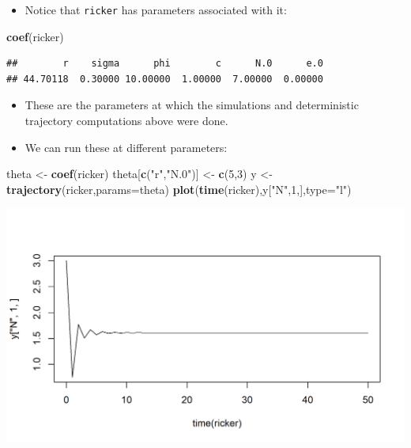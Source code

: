 \documentclass[]{article}
\newenvironment{Shaded}{\begin{snugshade}}{\end{snugshade}}
\newcommand{\KeywordTok}[1]{\textcolor[rgb]{0.13,0.29,0.53}{\textbf{#1}}}
\newcommand{\DataTypeTok}[1]{\textcolor[rgb]{0.13,0.29,0.53}{#1}}
\newcommand{\DecValTok}[1]{\textcolor[rgb]{0.00,0.00,0.81}{#1}}
\newcommand{\StringTok}[1]{\textcolor[rgb]{0.31,0.60,0.02}{#1}}
\newcommand{\NormalTok}[1]{#1}
\providecommand{\tightlist}{%
  \setlength{\itemsep}{0pt}\setlength{\parskip}{0pt}}
\begin{document}
\begin{itemize}
\tightlist
\item
  Notice that \texttt{ricker} has parameters associated with it:
\end{itemize}

\begin{Shaded}
\begin{Highlighting}[]
\KeywordTok{coef}\NormalTok{(ricker)}
\end{Highlighting}
\end{Shaded}

\begin{verbatim}
##        r    sigma      phi        c      N.0      e.0 
## 44.70118  0.30000 10.00000  1.00000  7.00000  0.00000
\end{verbatim}


\begin{itemize}
\item
  These are the parameters at which the simulations and deterministic
  trajectory computations above were done.
\item
  We can run these at different parameters:
\end{itemize}

\begin{Shaded}
\begin{Highlighting}[]
\NormalTok{theta <-}\StringTok{ }\KeywordTok{coef}\NormalTok{(ricker)}
\NormalTok{theta[}\KeywordTok{c}\NormalTok{(}\StringTok{"r"}\NormalTok{,}\StringTok{"N.0"}\NormalTok{)] <-}\StringTok{ }\KeywordTok{c}\NormalTok{(}\DecValTok{5}\NormalTok{,}\DecValTok{3}\NormalTok{)}
\NormalTok{y <-}\StringTok{ }\KeywordTok{trajectory}\NormalTok{(ricker,}\DataTypeTok{params=}\NormalTok{theta)}
\KeywordTok{plot}\NormalTok{(}\KeywordTok{time}\NormalTok{(ricker),y[}\StringTok{"N"}\NormalTok{,}\DecValTok{1}\NormalTok{,],}\DataTypeTok{type=}\StringTok{"l"}\NormalTok{)}
\end{Highlighting}
\end{Shaded}

\begin{center}\includegraphics{figure/intro-unnamed-chunk-5-1} \end{center}
\end{document}
